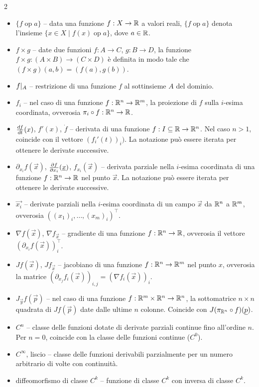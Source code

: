 \begin{multicols*}{2}
      \begin{itemize}
            \item $\{f \operatorname{op} a\}$ -- data una funzione $f : X \to \mathbb{R}$ a valori reali, $\{f \operatorname{op} a\}$ denota
                  l'insieme $\{ x \in X \mid f(x) \operatorname{op} a\}$, dove $a \in \mathbb{R}$.
            \item $f \times g$ -- date due funzioni $f : A \to C$, $g : B \to D$, la funzione $f \times g : (A \times B) \to (C \times D)$ è
                  definita in modo tale che $(f \times g)(a, b) = (f(a), g(b))$.
            \item $f\arrowvert_{A}$ -- restrizione di una funzione $f$ al sottinsieme $A$ del dominio.
            \item $f_i$ -- nel caso di una funzione $f : \mathbb{R}^n \to \mathbb{R}^m$, la proiezione di $f$ sulla $i$-esima coordinata, ovverosia
                  $\pi_i \circ f : \mathbb{R}^n \to \mathbb{R}$.
            \item $\der{f}{t}(x)$, $f'(x)$, $\dot{f}$ -- derivata di una funzione $f : I \subseteq \mathbb{R} \to \mathbb{R}^n$. Nel caso $n > 1$, coincide con
                  il vettore $({f_i}'(t))_i)$. La notazione può essere iterata per ottenere le derivate successive.
            \item $\partial_{x_i} f(\vec{x})$, $\frac{\partial f}{\partial x_i}({\underline{x}})$, $f_{x_i}(\vec{x})$ -- derivata parziale nella $i$-esima coordinata
                  di una funzione $f : \mathbb{R}^n \to \mathbb{R}$ nel punto $\vec{x}$. La notazione può essere iterata per ottenere le
                  derivate successive.
            \item $\vec{x_i}$ -- derivate parziali nella $i$-esima coordinata di un campo $\vec{x}$ da $\mathbb{R}^n$ a $\mathbb{R}^m$, ovverosia
                  $((x_1)_i, \ldots, (x_m)_i)^\top$.
            \item $\nabla f(\vec{x})$, $\nabla f_{\vec{x}}$ -- gradiente di una funzione $f : \mathbb{R}^n \to \mathbb{R}$, ovverosia il vettore $(\partial_{x_i} f(\vec{x}))_i^\top$.
            \item $J f(\vec{x})$, $J f_\vec{x}$ -- jacobiano di una funzione $f : \mathbb{R}^n \to \mathbb{R}^m$ nel punto $x$, ovverosia la matrice
                  $(\partial_{x_j} f_i (\vec{x}))_{i, j} = (\nabla f_i(\vec{x}))_{i}$.
            \item $J_{\vec{y}} f(\vec{p})$ -- nel caso di una funzione $f : \mathbb{R}^{m} \times \mathbb{R}^{n} \to \mathbb{R}^{n}$,
                  la sottomatrice $n \times n$ quadrata di $J f(\vec{p})$ date dalle ultime $n$ colonne. Coincide
                  con $J (\pi_{\mathbb{R}^n} \circ f)({\underline{p}})$.
            \item $C^n$ -- classe delle funzioni dotate di derivate parziali continue fino all'ordine $n$. Per $n = 0$, coincide con la classe delle funzioni continue ($C^0$).
            \item $C^\infty$, liscio -- classe delle funzioni derivabili parzialmente per un numero arbitrario di volte con continuità.
            \item diffeomorfismo di classe $C^k$ -- funzione di classe $C^k$ con inversa di classe $C^k$.
      \end{itemize}


\end{multicols*}
